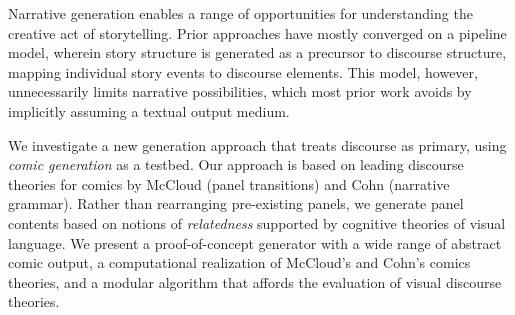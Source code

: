 Narrative generation enables a range of opportunities for understanding 
the creative act of storytelling.
Prior approaches have mostly converged on a pipeline model, wherein story
structure is generated as a precursor to discourse structure, mapping
individual story events to discourse elements. 
This model, however, unnecessarily limits narrative possibilities,
which most prior work avoids by implicitly assuming a textual output
medium.

We investigate a new generation approach that treats discourse as
primary, using {\em comic generation} as a testbed.  Our approach is based
on leading discourse theories for comics by McCloud (panel transitions) and
Cohn (narrative grammar). Rather than rearranging pre-existing panels, we
generate panel contents based on notions of {\em relatedness} supported by
cognitive theories of visual language.
We present a proof-of-concept generator with a wide range of abstract comic
output, a computational realization of McCloud's and Cohn's comics
theories, and a modular algorithm that affords the evaluation of visual
discourse theories.


